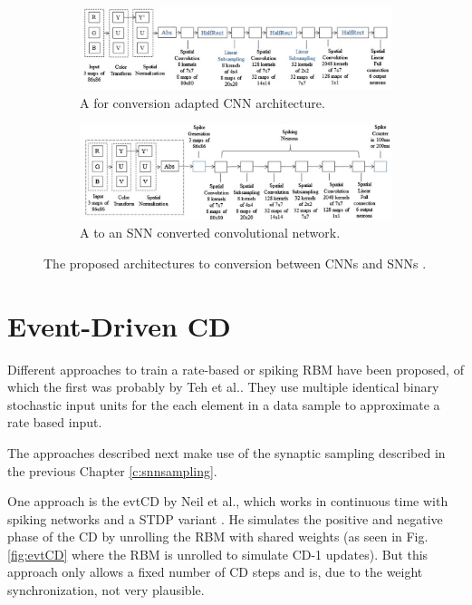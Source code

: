 \begin{figure}
	\centering
	\begin{subfigure}[t]{.80\textwidth}
  		\centering
  		\includegraphics[width=.97\linewidth]{imgs/cnn_snn_conv1.jpg}
  		\caption{A for conversion adapted CNN architecture.}
  		\label{fig:sub1}
	\end{subfigure}%
	
	\begin{subfigure}[t]{.80\textwidth}
  		\centering
  		\includegraphics[width=.97\linewidth]{imgs/cnn_snn_conv2.jpg}
  		\caption{A to an SNN converted convolutional network.}
  		\label{fig:sub2}
	\end{subfigure}
	\caption{The proposed architectures to conversion between CNNs and SNNs \cite{Cao2014}. }
	\label{fig:csnnconv}
\end{figure}

\section{Event-Driven CD} \label{c:ecd}

Different approaches to train a rate-based or spiking RBM have been proposed, of which the first was probably by Teh et al.\cite{Teh2005}.
They use multiple identical binary stochastic input units for the each element in a data sample to approximate a rate based input.

The approaches described next make use of the synaptic sampling described in the previous Chapter \ref{c:snnsampling}.

One approach is the evtCD by Neil et al., which works in continuous time with spiking networks and a STDP variant \cite{Diehl2015}.
He simulates the positive and negative phase of the CD by unrolling the RBM with shared weights (as seen in Fig. \ref{fig:evtCD} where the RBM is unrolled to simulate CD-1 updates). 
But this approach only allows a fixed number of CD steps and is, due to the weight synchronization, not very plausible.


